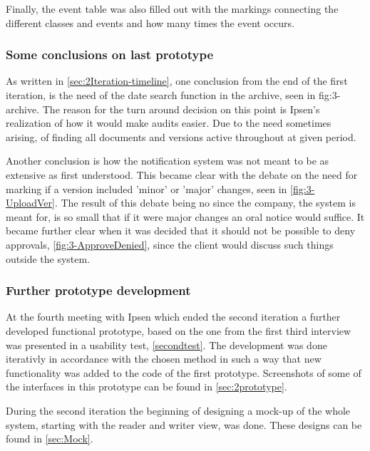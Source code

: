 Finally, the event table was also filled out with the markings connecting the different classes and events and how many times the event occurs.

\subsubsection*{Some conclusions on last prototype}
As written in \cref{sec:2Iteration-timeline}, one conclusion from the end of the first iteration, is the need of the date search function in the archive, seen in fig:3-archive.
The reason for the turn around decision on this point is Ipsen's realization of how it would make audits easier.
Due to the need sometimes arising, of finding all documents and versions active throughout at given period.

Another conclusion is how the notification system was not meant to be as extensive as first understood. 
This became clear with the debate on the need for marking if a version included 'minor' or 'major' changes, seen in \cref{fig:3-UploadVer}.
The result of this debate being no since the company, the system is meant for, is so small that if it were major changes an oral notice would suffice.
It became further clear when it was decided that it should not be possible to deny approvals, \cref{fig:3-ApproveDenied}, since the client would discuss such things outside the system.

\subsubsection*{Further prototype development}
At the fourth meeting with Ipsen which ended the second iteration a further developed functional prototype, based on the one from the first third interview was presented in a usability test, \cref{secondtest}.
The development was done iterativly in accordance with the chosen method in such a way that new functionality was added to the code of the first prototype.
Screenshots of some of the interfaces in this prototype can be found in \cref{sec:2prototype}.

During the second iteration the beginning of designing a mock-up of the whole system, starting with the reader and writer view, was done. 
These designs can be found in \cref{sec:Mock}.